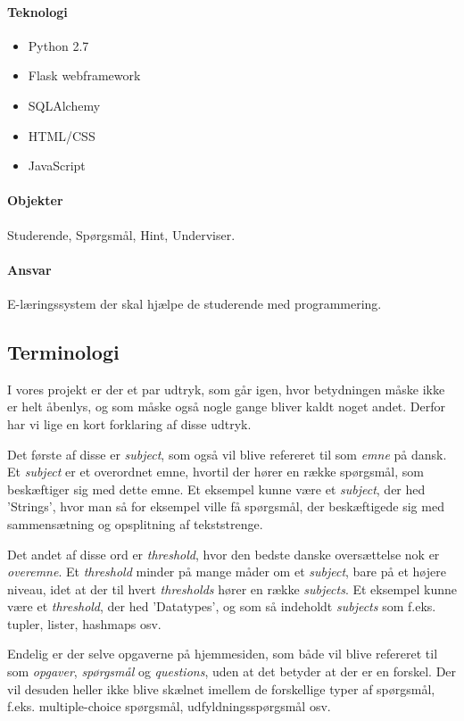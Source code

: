 \documentclass[11pt, a4paper]{article}
\begin{document}
\paragraph{Teknologi}
\begin{itemize}
    \item Python 2.7
    \item Flask webframework
    \item SQLAlchemy
    \item HTML/CSS
    \item JavaScript
\end{itemize}

\paragraph{Objekter}
Studerende, Spørgsmål, Hint, Underviser.

\paragraph{Ansvar}
E-læringssystem der skal hjælpe de studerende med programmering.

\subsection{Terminologi}
\label{sub:terminologi}
I vores projekt er der et par udtryk, som går igen, hvor betydningen måske ikke er helt åbenlys, og som måske også nogle gange bliver kaldt noget andet. Derfor har vi lige en kort forklaring af disse udtryk.

Det første af disse er \emph{subject}, som også vil blive refereret til som \emph{emne} på dansk. Et \emph{subject} er et overordnet emne, hvortil der hører en række spørgsmål, som beskæftiger sig med dette emne. Et eksempel kunne være et \emph{subject}, der hed 'Strings', hvor man så for eksempel ville få spørgsmål, der beskæftigede sig med sammensætning og opsplitning af tekststrenge.

Det andet af disse ord er \emph{threshold}, hvor den bedste danske oversættelse nok er \emph{overemne}. Et \emph{threshold} minder på mange måder om et \emph{subject}, bare på et højere niveau, idet at der til hvert \emph{thresholds} hører en række \emph{subjects}. Et eksempel kunne være et \emph{threshold}, der hed 'Datatypes', og som så indeholdt \emph{subjects} som f.eks. tupler, lister, hashmaps osv.

Endelig er der selve opgaverne på hjemmesiden, som både vil blive refereret til som \emph{opgaver}, \emph{spørgsmål} og \emph{questions}, uden at det betyder at der er en forskel. Der vil desuden heller ikke blive skælnet imellem de forskellige typer af spørgsmål, f.eks. multiple-choice spørgsmål, udfyldningsspørgsmål osv.
\end{document}
